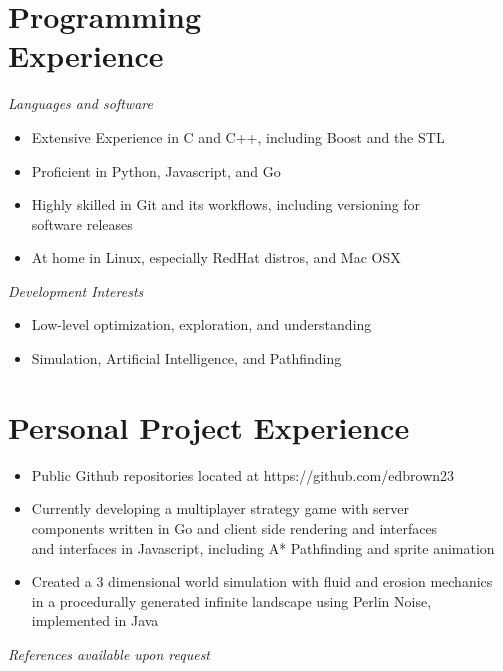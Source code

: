 \documentclass[line,margin]{res}
\begin{document}
\begin{resume}
    \section{Programming \\ Experience}
        {\sl Languages and software}
            \begin{itemize} \itemsep -2pt
                \item Extensive Experience in C and C++, including Boost and the STL
                \item Proficient in Python, Javascript, and Go
                \item Highly skilled in Git and its workflows, including versioning for \\
                      software releases
                \item At home in Linux, especially RedHat distros, and Mac OSX
            \end{itemize}
        {\sl Development Interests}
            \begin{itemize} \itemsep -2pt
                \item Low-level optimization, exploration, and understanding
                \item Simulation, Artificial Intelligence, and Pathfinding
            \end{itemize}
         
    \section{Personal Project Experience}
        \begin{itemize} \itemsep -2pt
            \item Public Github repositories located at https://github.com/edbrown23 
            \item Currently developing a multiplayer strategy game with server \\
                  components written in Go and client side rendering and interfaces \\
                  and interfaces in Javascript, including A* Pathfinding and sprite animation
            \item Created a 3 dimensional world simulation with fluid and erosion mechanics \\
                  in a procedurally generated infinite landscape using Perlin Noise, \\
                  implemented in Java
        \end{itemize}
            
    {\sl References available upon request}
    \end{resume}
\end{document}
